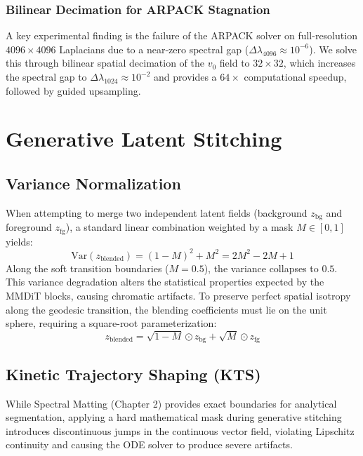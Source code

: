 \documentclass[12pt,a4paper]{report}
\begin{document}
\subsection{Bilinear Decimation for ARPACK Stagnation}
A key experimental finding is the failure of the ARPACK solver on full-resolution $4096 \times 4096$ Laplacians due to a near-zero spectral gap ($\Delta\lambda_{4096} \approx 10^{-6}$). We solve this through bilinear spatial decimation of the $v_0$ field to $32 \times 32$, which increases the spectral gap to $\Delta\lambda_{1024} \approx 10^{-2}$ and provides a $64\times$ computational speedup, followed by guided upsampling.

\chapter{Generative Latent Stitching}

\section{Variance Normalization}
When attempting to merge two independent latent fields (background $z_{\text{bg}}$ and foreground $z_{\text{fg}}$), a standard linear combination weighted by a mask $M \in [0, 1]$ yields:
\begin{equation}
    \text{Var}(z_{\text{blended}}) = (1 - M)^2 + M^2 = 2M^2 - 2M + 1
\end{equation}
Along the soft transition boundaries ($M=0.5$), the variance collapses to $0.5$. This variance degradation alters the statistical properties expected by the MMDiT blocks, causing chromatic artifacts. To preserve perfect spatial isotropy along the geodesic transition, the blending coefficients must lie on the unit sphere, requiring a square-root parameterization:
\begin{equation}
    z_{\text{blended}} = \sqrt{1 - M} \odot z_{\text{bg}} + \sqrt{M} \odot z_{\text{fg}}
\end{equation}

\section{Kinetic Trajectory Shaping (KTS)}
While Spectral Matting (Chapter 2) provides exact boundaries for analytical segmentation, applying a hard mathematical mask during generative stitching introduces discontinuous jumps in the continuous vector field, violating Lipschitz continuity and causing the ODE solver to produce severe artifacts.
\end{document}
